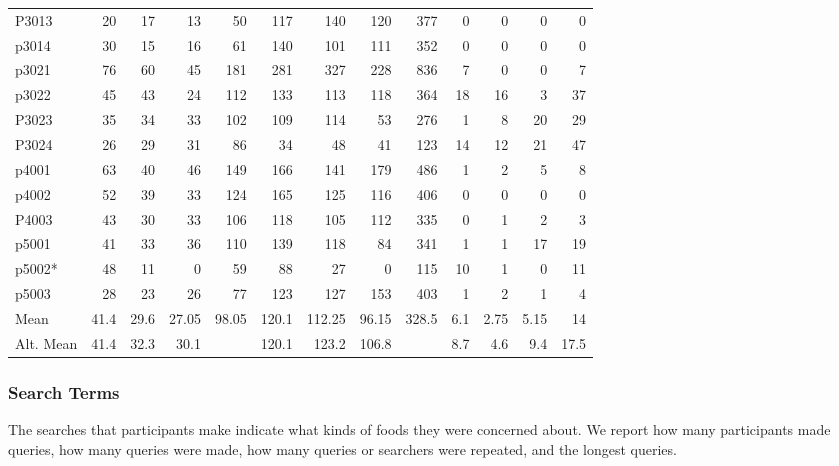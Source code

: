 \begin{table}[htbp]
\begin{tabular}{lrrrrrrrrrrrr}
    P3013 & 20    & 17    & 13    & 50    & 117   & 140   & 120   & 377   & 0     & 0     & 0     & 0 \\
    p3014 & 30    & 15    & 16    & 61    & 140   & 101   & 111   & 352   & 0     & 0     & 0     & 0 \\
    p3021 & 76    & 60    & 45    & 181   & 281   & 327   & 228   & 836   & 7     & 0     & 0     & 7 \\
    p3022 & 45    & 43    & 24    & 112   & 133   & 113   & 118   & 364   & 18    & 16    & 3     & 37 \\
    P3023 & 35    & 34    & 33    & 102   & 109   & 114   & 53    & 276   & 1     & 8     & 20    & 29 \\
    P3024 & 26    & 29    & 31    & 86    & 34    & 48    & 41    & 123   & 14    & 12    & 21    & 47 \\
    p4001 & 63    & 40    & 46    & 149   & 166   & 141   & 179   & 486   & 1     & 2     & 5     & 8 \\
    p4002 & 52    & 39    & 33    & 124   & 165   & 125   & 116   & 406   & 0     & 0     & 0     & 0 \\
    P4003 & 43    & 30    & 33    & 106   & 118   & 105   & 112   & 335   & 0     & 1     & 2     & 3 \\
    p5001 & 41    & 33    & 36    & 110   & 139   & 118   & 84    & 341   & 1     & 1     & 17    & 19 \\
    p5002* & 48    & 11    & 0     & 59    & 88    & 27    & 0     & 115   & 10    & 1     & 0     & 11 \\
    p5003 & 28    & 23    & 26    & 77    & 123   & 127   & 153   & 403   & 1     & 2     & 1     & 4 \\
\midrule
    Mean  & 41.4  & 29.6  & 27.05 & 98.05 & 120.1 & 112.25 & 96.15 & 328.5 & 6.1   & 2.75  & 5.15  & 14 \\
    Alt. Mean & 41.4  & 32.3  & 30.1  &       & 120.1 & 123.2 & 106.8 &       & 8.7   & 4.6   & 9.4   & 17.5 \\

    \bottomrule
    \end{tabular}%
  \label{tab:strategy_table}%
\end{table}%


\subsubsection{Search Terms}
The searches that participants make indicate what kinds of foods they were concerned about. We report how many participants made queries, how many queries were made, how many queries or searchers were repeated, and the longest queries. 

